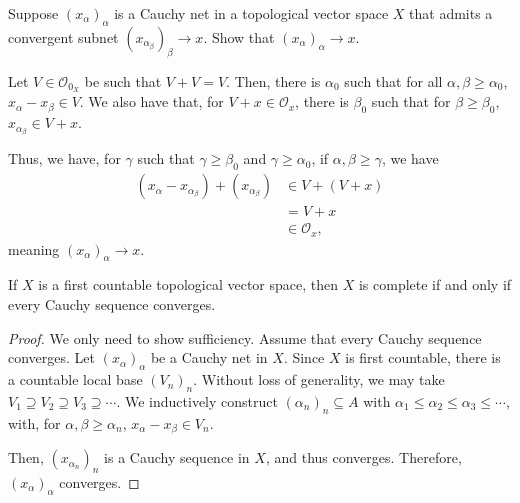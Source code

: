 \documentclass[10pt]{mypackage}
\begin{document}
\begin{exercise}
  Suppose $\left(x_{\alpha}\right)_{\alpha}$ is a Cauchy net in a topological vector space $X$ that admits a convergent subnet $\left(x_{\alpha_{\beta}}\right)_{\beta}\rightarrow x$. Show that $\left(x_{\alpha}\right)_{\alpha}\rightarrow x$.
\end{exercise}
\begin{solution}
  Let $V\in \mathcal{O}_{0_{X}}$ be such that $V+V = V$. Then, there is $\alpha_0$ such that for all $\alpha,\beta \geq \alpha_0$, $x_{\alpha}-x_{\beta}\in V$. We also have that, for $V+x\in \mathcal{O}_{x}$, there is $\beta_0$ such that for $\beta \geq \beta_0$, $x_{\alpha_{\beta}} \in V + x$.\newline

  Thus, we have, for $\gamma$ such that $\gamma \geq \beta_0$ and $\gamma \geq \alpha_0$, if $\alpha,\beta \geq \gamma$, we have
  \begin{align*}
    \left(x_{\alpha}-x_{\alpha_{\beta}}\right) + \left(x_{\alpha_{\beta}}\right) &\in V + \left(V+x\right)\\
                                                                                     &= V + x\\
                                                                                     &\in \mathcal{O}_{x},
  \end{align*}
  meaning $\left(x_{\alpha}\right)_{\alpha}\rightarrow x$.
\end{solution}
\begin{proposition}
  If $X$ is a first countable topological vector space, then $X$ is complete if and only if every Cauchy sequence converges.
\end{proposition}
\begin{proof}
  We only need to show sufficiency. Assume that every Cauchy sequence converges. Let $\left(x_{\alpha}\right)_{\alpha}$ be a Cauchy net in $X$. Since $X$ is first countable, there is a countable local base $\left(V_{n}\right)_n$. Without loss of generality, we may take $V_1\supseteq V_2\supseteq V_3\supseteq \cdots$. We inductively construct $\left(\alpha_{n}\right)_{n}\subseteq A$ with $\alpha_{1}\leq \alpha_{2}\leq \alpha_{3}\leq \cdots$, with, for $\alpha,\beta \geq \alpha_{n}$, $x_{\alpha} - x_{\beta}\in V_{n}$.\newline

  Then, $\left(x_{\alpha_{n}}\right)_{n}$ is a Cauchy sequence in $X$, and thus converges. Therefore, $\left(x_{\alpha}\right)_{\alpha}$ converges.
\end{proof}
\end{document}
